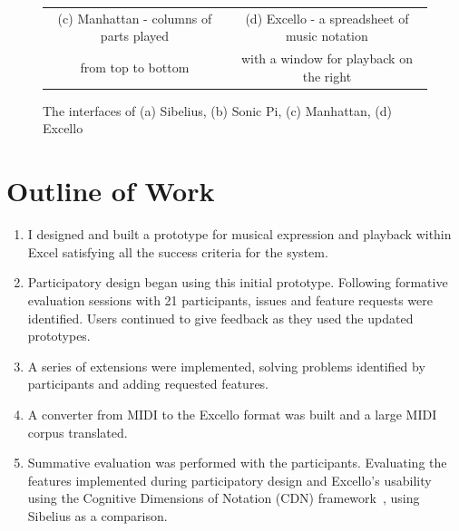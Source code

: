 \begin{figure}[ht]
\begin{tabular}{cc}
  (c) Manhattan - columns of parts played&(d) Excello - a spreadsheet of music notation\\
  from top to bottom&with a window for playback on the right\\
\end{tabular}
\caption{The interfaces of (a) Sibelius, (b) Sonic Pi, (c) Manhattan, (d) Excello}
\label{intro:interfaces}
\end{figure}

\vspace{-10pt}

\section{Outline of Work}

\begin{enumerate}

\item I designed and built a prototype for musical expression and playback within Excel satisfying all the success criteria for the system.

\item Participatory design began using this initial prototype. Following formative evaluation sessions with 21 participants, issues and feature requests were identified. Users continued to give feedback as they used the updated prototypes.

\item A series of extensions were implemented, solving problems identified by participants and adding requested features.

\item A converter from MIDI to the Excello format was built and a large MIDI corpus translated.

\item Summative evaluation was performed with the participants. Evaluating the features implemented during participatory design and Excello's usability using the Cognitive Dimensions of Notation (CDN) framework~\cite{blackwell:tutorial}, using Sibelius as a comparison.

\end{enumerate}

